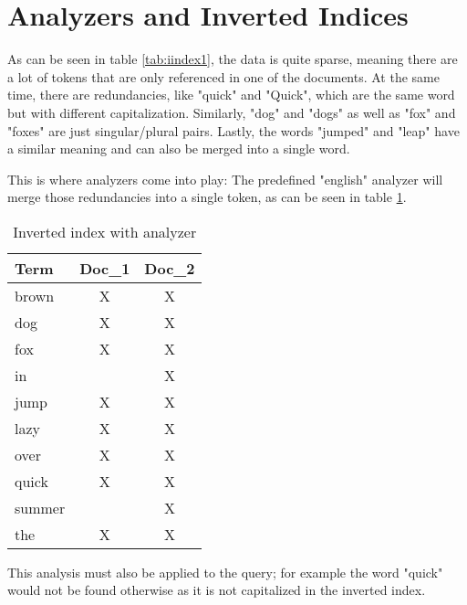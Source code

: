 \section{Analyzers and Inverted Indices}
As can be seen in table \ref{tab:iindex1}, the data is quite sparse, meaning there are a lot of tokens that are only referenced in one of the documents. At the same time, there are redundancies, like "quick" and "Quick", which are the same word but with different capitalization. Similarly, "dog" and "dogs" as well as "fox" and "foxes" are just singular/plural pairs. Lastly, the words "jumped" and "leap" have a similar meaning and can also be merged into a single word.

This is where analyzers come into play: The predefined "english" analyzer will merge those redundancies into a single token, as can be seen in table \ref{tab:iindex3}.

\begin{table}
    \centering
    \begin{tabular}{ | l | c | c | }
        \hline
        Term    & Doc\_1 & Doc\_2 \\ \hline
        \hline
        brown   &   X   &  X  \\
        dog     &   X   &  X  \\
        fox     &   X   &  X  \\
        in      &       &  X  \\
        jump    &   X   &  X  \\
        lazy    &   X   &  X  \\
        over    &   X   &  X  \\
        quick   &   X   &  X  \\
        summer  &       &  X  \\
        the     &   X   &  X  \\
        \hline
    \end{tabular}
    \caption{Inverted index with analyzer \autocite{elasticsearch_iindex}}
    \label{tab:iindex3}
\end{table}

This analysis must also be applied to the query; for example the word "quick" would not be found otherwise as it is not capitalized in the inverted index.

